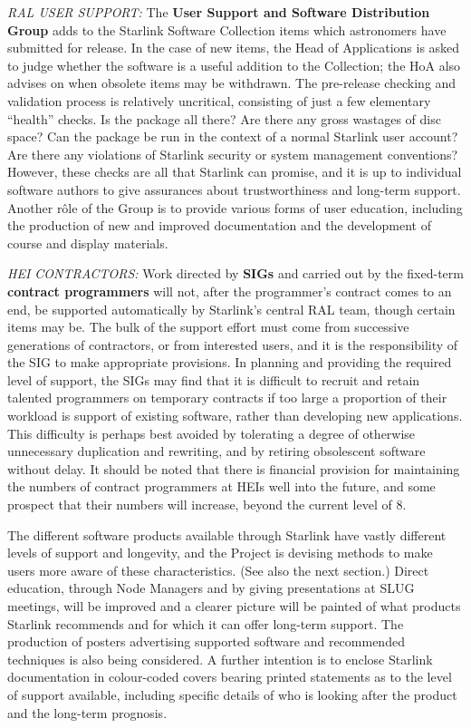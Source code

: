 {\it RAL USER SUPPORT:}  \hspace{2ex} The
{\bf User Support and Software Distribution Group}
adds to the Starlink Software Collection
items which astronomers have submitted for release.
In the case of new items, the Head of Applications is
asked to judge whether the software is a useful
addition to the Collection;  the HoA also advises
on when obsolete items may be withdrawn.  The
pre-release checking and validation process is relatively uncritical,
consisting of just a few elementary ``health'' checks.
Is the package all there?  Are
there any gross wastages of disc space?  Can the package
be run in the context of a normal Starlink user account?
Are there any violations of Starlink
security or system management conventions?
However, these checks are all that Starlink can promise,
and it is up to individual software authors to give
assurances about trustworthiness and long-term support.
Another r\^{o}le of the Group is to provide various forms
of user education, including the production of new and improved
documentation and the development of course and display materials.

{\it HEI CONTRACTORS:} \hspace{2ex} Work directed by {\bf SIGs} and carried out
by the fixed-term {\bf contract programmers}
will not, after the programmer's
contract comes to an end, be supported
automatically by Starlink's central RAL team,
though certain items may be.  The bulk of the
support effort must come from successive generations of contractors, or from
interested users, and it is the responsibility of the
SIG to make appropriate provisions.  In planning and providing the required
level of support, the SIGs may find that it is
difficult to recruit and retain talented
programmers on temporary contracts if too large a proportion of
their workload is support of existing software, rather than
developing new applications.  This difficulty is
perhaps best avoided by tolerating a degree of
otherwise unnecessary duplication and rewriting, and by
retiring obsolescent software without delay.  It should be noted
that there is financial provision for maintaining the numbers of
contract programmers at HEIs well into the future, and some prospect
that their numbers will increase, beyond the current level of 8.

The different software products available through Starlink have
vastly different levels of support and longevity, and
the Project is devising methods to make users more aware of these
characteristics.  (See also the next section.)
Direct education, through Node Managers
and by giving presentations at SLUG meetings, will
be improved and a clearer picture will be painted of what
products Starlink recommends and for which it can offer long-term support.
The production of
posters advertising supported software and recommended
techniques is also being considered.  A further intention
is to enclose Starlink documentation in
colour-coded covers bearing printed statements as to the
level of support available, including specific details of
who is looking after the product and the long-term prognosis.


